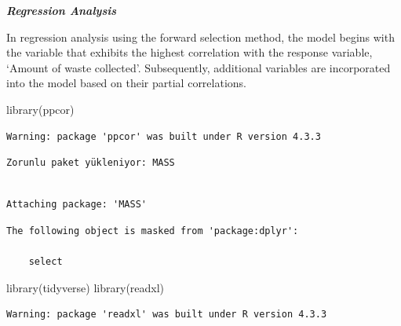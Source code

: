\documentclass[
  11pt,
  a4paper,
  DIV=11,
  numbers=noendperiod]{scrartcl}
\newenvironment{Shaded}{\begin{snugshade}}{\end{snugshade}}
\newcommand{\FunctionTok}[1]{\textcolor[rgb]{0.28,0.35,0.67}{#1}}
\newcommand{\NormalTok}[1]{\textcolor[rgb]{0.00,0.23,0.31}{#1}}
\begin{document}
\textbf{\emph{Regression Analysis}}

In regression analysis using the forward selection method, the model
begins with the variable that exhibits the highest correlation with the
response variable, `Amount of waste collected'. Subsequently, additional
variables are incorporated into the model based on their partial
correlations.

\begin{Shaded}
\begin{Highlighting}[]
\FunctionTok{library}\NormalTok{(ppcor)}
\end{Highlighting}
\end{Shaded}

\begin{verbatim}
Warning: package 'ppcor' was built under R version 4.3.3
\end{verbatim}

\begin{verbatim}
Zorunlu paket yükleniyor: MASS
\end{verbatim}

\begin{verbatim}

Attaching package: 'MASS'
\end{verbatim}

\begin{verbatim}
The following object is masked from 'package:dplyr':

    select
\end{verbatim}

\begin{Shaded}
\begin{Highlighting}[]
\FunctionTok{library}\NormalTok{(tidyverse)}
\FunctionTok{library}\NormalTok{(readxl)}
\end{Highlighting}
\end{Shaded}

\begin{verbatim}
Warning: package 'readxl' was built under R version 4.3.3
\end{verbatim}
\end{document}

